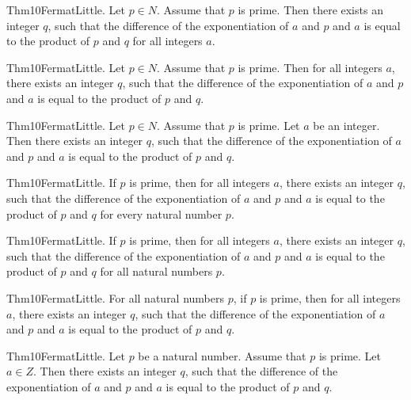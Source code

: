 \documentclass{article}
\begin{document}
Thm10FermatLittle. Let $p \in N$. Assume that $p$ is prime. Then there exists an integer $q$, such that the difference of the exponentiation of $a$ and $p$ and $a$ is equal to the product of $p$ and $q$ for all integers $a$.

Thm10FermatLittle. Let $p \in N$. Assume that $p$ is prime. Then for all integers $a$, there exists an integer $q$, such that the difference of the exponentiation of $a$ and $p$ and $a$ is equal to the product of $p$ and $q$.

Thm10FermatLittle. Let $p \in N$. Assume that $p$ is prime. Let $a$ be an integer. Then there exists an integer $q$, such that the difference of the exponentiation of $a$ and $p$ and $a$ is equal to the product of $p$ and $q$.

Thm10FermatLittle. If $p$ is prime, then for all integers $a$, there exists an integer $q$, such that the difference of the exponentiation of $a$ and $p$ and $a$ is equal to the product of $p$ and $q$ for every natural number $p$.

Thm10FermatLittle. If $p$ is prime, then for all integers $a$, there exists an integer $q$, such that the difference of the exponentiation of $a$ and $p$ and $a$ is equal to the product of $p$ and $q$ for all natural numbers $p$.

Thm10FermatLittle. For all natural numbers $p$, if $p$ is prime, then for all integers $a$, there exists an integer $q$, such that the difference of the exponentiation of $a$ and $p$ and $a$ is equal to the product of $p$ and $q$.

Thm10FermatLittle. Let $p$ be a natural number. Assume that $p$ is prime. Let $a \in Z$. Then there exists an integer $q$, such that the difference of the exponentiation of $a$ and $p$ and $a$ is equal to the product of $p$ and $q$.
\end{document}
